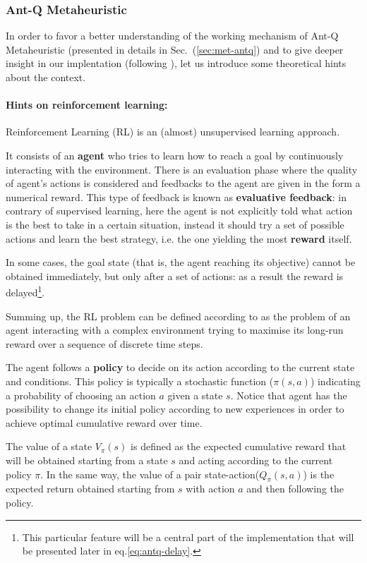 \documentclass[10pt]{article}
\begin{document}
\subsubsection{Ant-Q Metaheuristic}\label{sec:antq}
In order to favor a better understanding of the working mechanism of Ant-Q Metaheuristic (presented in details in Sec.~(\ref{sec:met-antq}) and to give deeper insight in our implentation (following \cite{undici} ), let us introduce some theoretical hints about the context.
\paragraph{Hints on reinforcement learning:}
Reinforcement  Learning  (RL)  is  an  (almost) unsupervised  learning  approach.

It consists of an  \textbf{agent}  who tries to learn how to reach a goal by continuously interacting with  the environment. 
There is an evaluation phase where the quality of agent's actions is considered and feedbacks to the agent are given in the form a numerical reward. 
This type of feedback is known as \textbf{evaluative feedback}: in contrary of supervised learning, here the agent is not explicitly told what action is the best to take in a  certain  situation, instead it should try a set of possible actions and learn the best strategy, i.e. the one yielding the most \textbf{reward} itself.  

In some cases, the goal state (that is, the agent reaching its objective) cannot be obtained immediately, but only after a set of actions: as a result the reward is delayed\footnote{This particular feature will be a central part of the implementation that will be presented later in eq.\ref{eq:antq-delay}.}. 

Summing up, the  RL  problem  can  be  defined according to \cite{diciotto} as  the  problem  of  an agent  interacting  with  a  complex environment trying to maximise its long-run reward over a sequence of discrete time steps.

The agent follows a \textbf{policy} to decide on its action according to the current state and conditions. 
This policy is typically a  stochastic  function ($\pi(s,a)$) indicating a probability  of  choosing an action $a$ given a state $s$.
Notice that agent has the possibility to change its initial policy  according  to  new experiences  in order to  achieve  optimal cumulative  reward  over  time.  

The  value  of  a  state $V_\pi(s)$  is  defined  as  the  expected  cumulative reward that  will  be  obtained starting from a state $s$ and acting according to the current policy $\pi$. 
In the same way, the value of  a pair state-action($Q_\pi(s,a)$) is  the  expected  return  obtained starting  from  $s$  with  action $a$  and  then following  the policy. 
\end{document}
